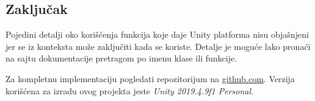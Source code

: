 \subsection{Zaklju\v{c}ak}

Pojedini detalji oko kori\v{s}\'cenja funkcija koje daje Unity platforma nisu obja\v{s}njeni jer se iz konteksta
mo\v{z}e zaklju\v{c}iti kada se koriste. Detalje je mogu\'ce lako prona\'ci na sajtu dokumentacije pretragom po imenu
klase ili funkcije. 

Za kompletnu implementaciju pogledati repozitorijum na \href{http://github.com/rtojagic/andromeda}{github.com}. 
Verzija kori\v{s}\'cena za izradu ovog projekta jeste \emph{Unity 2019.4.9f1 Personal}.